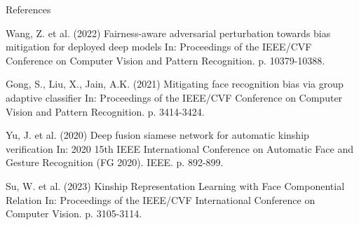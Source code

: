 \documentclass[aspectratio=169,xcolor=dvipsnames]{beamer}
\begin{document}
\begin{frame}{References}
    \footnotesize{
        \begin{thebibliography}{99}
             Wang, Z. et al. (2022)
            \newblock Fairness-aware adversarial perturbation towards bias mitigation for deployed deep models
            \newblock In: Proceedings of the IEEE/CVF Conference on Computer Vision and Pattern Recognition. p. 10379-10388.
            
             Gong, S., Liu, X., Jain, A.K. (2021)
            \newblock Mitigating face recognition bias via group adaptive classifier
            \newblock In: Proceedings of the IEEE/CVF Conference on Computer Vision and Pattern Recognition. p. 3414-3424.
            
             Yu, J. et al. (2020)
            \newblock Deep fusion siamese network for automatic kinship verification
            \newblock In: 2020 15th IEEE International Conference on Automatic Face and Gesture Recognition (FG 2020). IEEE. p. 892-899.
            
             Su, W. et al. (2023)
            \newblock Kinship Representation Learning with Face Componential Relation
            \newblock In: Proceedings of the IEEE/CVF International Conference on Computer Vision. p. 3105-3114.
        \end{thebibliography}
    }
\end{frame}
\end{document}
